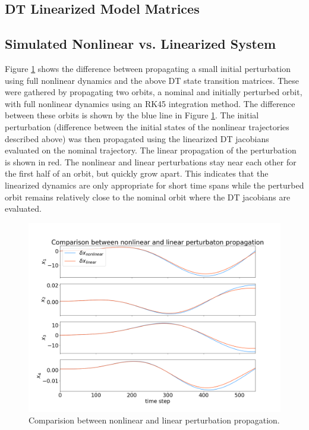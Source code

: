 \documentclass[11pt, a4paper]{article}
\begin{document}
\subsection{DT Linearized Model Matrices}

\subsection{Simulated Nonlinear vs. Linearized System}
Figure \ref{fig:nlvl_s} shows the difference between propagating a small initial perturbation using full nonlinear dynamics and the above DT state transition matrices. 
These were gathered by propagating two orbits, a nominal and initially perturbed orbit, with full nonlinear dynamics using an RK45 integration method.
The difference between these orbits is shown by the blue line in Figure \ref{fig:nlvl_s}. 
The initial perturbation (difference between the initial states of the nonlinear trajectories described above) was then propagated using the linearized DT jacobians evaluated on the nominal trajectory. 
The linear propagation of the perturbation is shown in red. 
The nonlinear and linear perturbations stay near each other for the first half of an orbit, but quickly grow apart.
This indicates that the linearized dynamics are only appropriate for short time spans while the perturbed orbit remains relatively close to the nominal orbit where the DT jacobians are evaluated. 

\begin{figure}[H]
	\centering
	\includegraphics[width=\textwidth]{./Figures/nonlvl_state.png}
	\caption{Comparision between nonlinear and linear perturbation propagation.}
	\label{fig:nlvl_s}
\end{figure}
\end{document}
